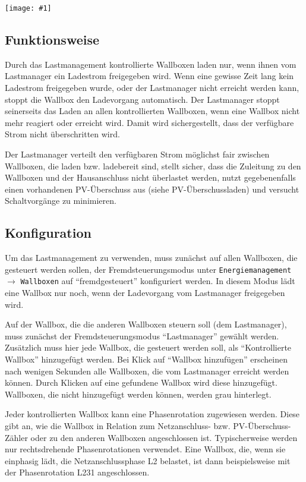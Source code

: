 \documentclass[a4paper,10pt]{article}
\newcommand{\gfx}[1]{\texttt{[image: \#1]}}
\begin{document}
\begin{multicols*}{2}
    \gfx{./img_warp3/resized/web_charge_manager_settings}

    \subsection{Funktionsweise}
    Durch das Lastmanagement kontrollierte Wallboxen laden nur, wenn ihnen vom Lastmanager ein Ladestrom freigegeben wird. Wenn eine gewisse Zeit lang kein Ladestrom freigegeben wurde, oder der Lastmanager nicht erreicht werden kann, stoppt die Wallbox den Ladevorgang automatisch. Der Lastmanager stoppt seinerseits das Laden an allen kontrollierten Wallboxen, wenn eine Wallbox nicht mehr reagiert oder erreicht wird. Damit wird sichergestellt, dass der verfügbare Strom nicht überschritten wird.

    Der Lastmanager verteilt den verfügbaren Strom möglichst fair zwischen Wallboxen, die laden bzw. ladebereit sind, stellt sicher, dass die Zuleitung zu den Wallboxen und der Hausanschluss nicht überlastet werden, nutzt gegebenenfalls einen vorhandenen PV-Überschuss aus (siehe PV-Überschussladen) und versucht Schaltvorgänge zu minimieren.

    \subsection{Konfiguration}
    Um das Lastmanagement zu verwenden, muss zunächst auf allen Wallboxen, die gesteuert werden sollen,
    der Fremdsteuerungsmodus unter \texttt{Energiemanagement} $\rightarrow$ \texttt{Wallboxen} auf \enquote{fremdgesteuert} konfiguriert werden.
    In diesem Modus lädt eine Wallbox nur noch, wenn der Ladevorgang vom Lastmanager freigegeben wird.

    Auf der Wallbox, die die anderen Wallboxen steuern soll (dem Lastmanager), muss zunächst der Fremdsteuerungsmodus \enquote{Lastmanager} gewählt werden.
    Zusätzlich muss hier jede Wallbox, die gesteuert werden soll, als \enquote{Kontrollierte Wallbox} hinzugefügt werden.
    Bei Klick auf \enquote{Wallbox hinzufügen} erscheinen nach wenigen Sekunden alle Wallboxen, die vom Lastmanager erreicht werden können.
    Durch Klicken auf eine gefundene Wallbox wird diese hinzugefügt. Wallboxen, die nicht hinzugefügt werden können, werden grau hinterlegt.

    Jeder kontrollierten Wallbox kann eine Phasenrotation zugewiesen werden. Diese gibt an, wie die Wallbox in Relation zum Netz­an­schluss- bzw. PV-Über­schuss-Zähler oder zu den anderen Wallboxen an­ge­schlos­sen ist. Ty­pi­scher­wei­se werden nur rechts­dre­hen­de Pha­sen­ro­ta­ti­o­nen verwendet. Eine Wallbox, die, wenn sie einphasig lädt, die Netz­an­schluss­pha­se L2 belastet, ist dann bei­spiels­weise mit der Pha­sen­ro­ta­ti­on L231 an­ge­schlos­sen.


\end{multicols*}
\end{document}
